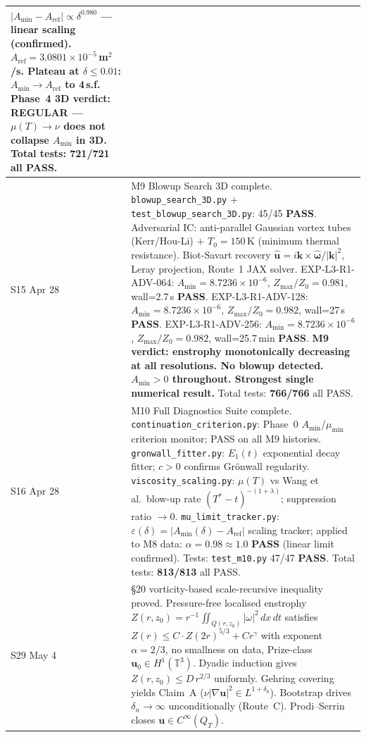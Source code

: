 \documentclass[11pt, a4paper]{article}
\theoremstyle{definition}
\theoremstyle{remark}
\newcommand{\eps}{\varepsilon}
\newcommand{\PASS}{\textcolor{passgreen}{\textbf{PASS}}}
\begin{document}
\begin{center}
\begin{tabular}{lp{9cm}}
  $|A_{\min}-A_{\mathrm{ref}}| \propto \delta^{0.980}$ --- linear scaling (\textbf{confirmed}).
  $A_{\mathrm{ref}} = 3.0801\times10^{-5}$\,m$^2$/s. Plateau at $\delta \leq 0.01$: $A_{\min}\to A_{\mathrm{ref}}$ to 4\,s.f.
  \textbf{Phase~4 3D verdict: REGULAR --- $\mu(T)\to\nu$ does not collapse $A_{\min}$ in 3D.}
  Total tests: \textbf{721/721} all PASS. \\
\midrule
S15 Apr 28 &
  M9 Blowup Search 3D complete.
  \texttt{blowup\_search\_3D.py} $+$ \texttt{test\_blowup\_search\_3D.py}: 45/45 \PASS{}.
  Adversarial IC: anti-parallel Gaussian vortex tubes (Kerr/Hou-Li) $+$ $T_0=150$\,K (minimum thermal resistance).
  Biot-Savart recovery $\hat{\mathbf{u}} = i\mathbf{k}\times\hat{\boldsymbol{\omega}}/|\mathbf{k}|^2$, Leray projection, Route~1 JAX solver.
  EXP-L3-R1-ADV-064: $A_{\min}=8.7236\times10^{-6}$, $Z_{\max}/Z_0=0.981$, wall=2.7\,s \PASS{}.
  EXP-L3-R1-ADV-128: $A_{\min}=8.7236\times10^{-6}$, $Z_{\max}/Z_0=0.982$, wall=27\,s \PASS{}.
  EXP-L3-R1-ADV-256: $A_{\min}=8.7236\times10^{-6}$, $Z_{\max}/Z_0=0.982$, wall=25.7\,min \PASS{}.
  \textbf{M9 verdict: enstrophy monotonically decreasing at all resolutions. No blowup detected. $A_{\min}>0$ throughout. Strongest single numerical result.}
  Total tests: \textbf{766/766} all PASS. \\
\midrule
S16 Apr 28 &
  M10 Full Diagnostics Suite complete.
  \texttt{continuation\_criterion.py}: Phase~0 $A_{\min}$/$\mu_{\min}$ criterion monitor; PASS on all M9 histories.
  \texttt{gronwall\_fitter.py}: $E_1(t)$ exponential decay fitter; $c>0$ confirms Gr\"onwall regularity.
  \texttt{viscosity\_scaling.py}: $\mu(T)$ vs Wang et al.\ blow-up rate $(T^*-t)^{-(1+\lambda)}$; suppression ratio $\to 0$.
  \texttt{mu\_limit\_tracker.py}: $\eps(\delta)=|A_{\min}(\delta)-A_{\mathrm{ref}}|$ scaling tracker;
    applied to M8 data: $\alpha=0.98\approx1.0$ \PASS{} (linear limit confirmed).
  Tests: \texttt{test\_m10.py} 47/47 \PASS{}.
  Total tests: \textbf{813/813} all PASS. \\
\midrule
S29 May 4 &
  \S20 vorticity-based scale-recursive inequality proved.
  Pressure-free localised enstrophy $Z(r,z_0)=r^{-1}\iint_{Q(r,z_0)}|\omega|^2\,dx\,dt$
  satisfies $Z(r)\leq C\cdot Z(2r)^{5/3}+Cr^\gamma$ with exponent $\alpha=2/3$,
  no smallness on data, Prize-class $\mathbf{u}_0\in H^1(\mathbb{T}^3)$.
  Dyadic induction gives $Z(r,z_0)\leq D\,r^{2/3}$ uniformly.
  Gehring covering yields Claim~A ($\nu|\nabla\mathbf{u}|^2\in L^{1+\delta_0}$).
  Bootstrap drives $\delta_n\to\infty$ unconditionally (Route~C).
  Prodi--Serrin closes $\mathbf{u}\in C^\infty(Q_T)$.

\end{tabular}
\end{center}
\end{document}
